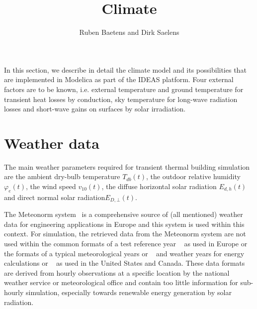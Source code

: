 
\title{Climate}

\author{Ruben Baetens and Dirk Saelens}
\maketitle


\vspace{\baselineskip}

In this section, we describe in detail the climate model and its possibilities that are implemented in Modelica as part of the IDEAS platform. Four external factors are to be known, i.e. external temperature and ground temperature for transient heat losses by conduction, sky temperature for long-wave radiation losses and short-wave gains on surfaces by solar irradiation.

\section{Weather data}
\label{chap:climwea}

The main weather parameters required for transient thermal building simulation are the ambient dry-bulb temperature $T_{db}(t)$, the outdoor relative humidity $\varphi_{e}(t)$, the wind speed $v_{10}(t)$, the diffuse horizontal solar radiation $E_{d,h}(t)$ and direct normal solar radiation$E_{D,\bot}(t)$. 

The Meteonorm system~\cite{Meteotest2008} is a comprehensive source of (all mentioned) weather data for engineering applications in Europe and this system is used within this context. For simulation, the retrieved data from the Meteonorm system are not used within the common formats of a test reference year ~\cite{NCDC1981,EC1985} as used in Europe or the formats of a typical meteorological years  or ~\cite{NCDC1976b,NREC1995} and weather years for energy calculations  or ~\cite{ASHRAE1985} as used in the United States and Canada. These data formats are derived from hourly observations at a specific location by the national weather service or meteorological office and contain too little information for sub-hourly simulation, especially towards renewable energy generation by solar radiation.

